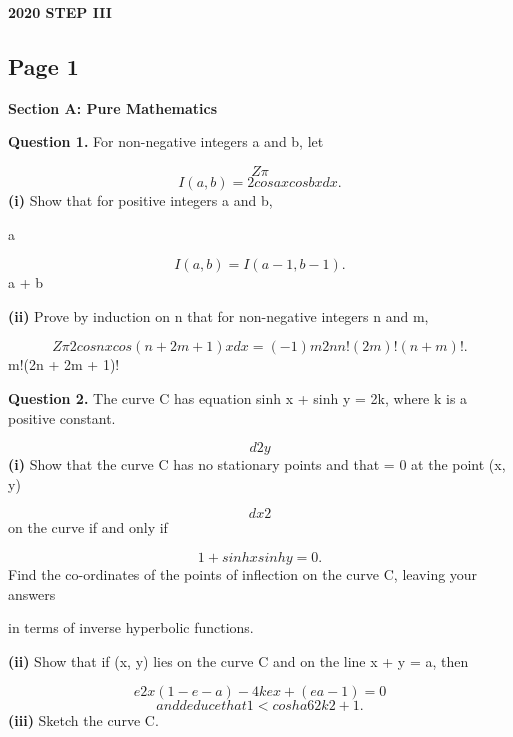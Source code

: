 \documentclass[12pt]{article}
\begin{document}
\begin{center}
{\Large \textbf{2020 STEP III}}
\end{center}

\subsection*{Page 1}
\begin{flushleft}
\bigskip\textbf{Section A: Pure Mathematics}\par
\bigskip\textbf{Question 1.} For non-negative integers a and b, let\par
\[Z \pi\]
\[I(a, b) = 2 cosa x cos bx dx.\]
\textbf{(i)} Show that for positive integers a and b,\par
a\par
\[I(a, b) = I(a - 1, b - 1).\]
a + b\par
\textbf{(ii)} Prove by induction on n that for non-negative integers n and m,\par
\[Z \pi 2 cosn x cos(n + 2m + 1)x dx = (-1)m 2nn!(2m)!(n + m)! .\]
m!(2n + 2m + 1)!\par
\bigskip\textbf{Question 2.} The curve C has equation sinh x + sinh y = 2k, where k is a positive constant.\par
\[d2y\]
\textbf{(i)} Show that the curve C has no stationary points and that = 0 at the point (x, y)\par
\[dx2\]
on the curve if and only if\par
\[1 + sinh x sinh y = 0.\]
Find the co-ordinates of the points of inflection on the curve C, leaving your answers\par
in terms of inverse hyperbolic functions.\par
\textbf{(ii)} Show that if (x, y) lies on the curve C and on the line x + y = a, then\par
\[e2x(1 - e-a) - 4kex + (ea - 1) = 0\]
\[and deduce that 1 < cosh a 6 2k2 + 1.\]
\textbf{(iii)} Sketch the curve C.\par
\end{flushleft}
\end{document}
